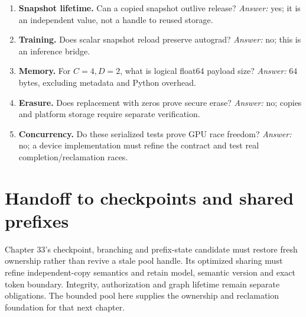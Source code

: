 \begin{enumerate}
\item \textbf{Snapshot lifetime.} Can a copied snapshot outlive release?
\emph{Answer:} yes; it is an independent value, not a handle to reused storage.
\item \textbf{Training.} Does scalar snapshot reload preserve autograd?
\emph{Answer:} no; this is an inference bridge.
\item \textbf{Memory.} For $C=4,D=2$, what is logical float64 payload size?
\emph{Answer:} $64$ bytes, excluding metadata and Python overhead.
\item \textbf{Erasure.} Does replacement with zeros prove secure erase?
\emph{Answer:} no; copies and platform storage require separate verification.
\item \textbf{Concurrency.} Do these serialized tests prove GPU race freedom?
\emph{Answer:} no; a device implementation must refine the contract and test
real completion/reclamation races.
\end{enumerate}

\section{Handoff to checkpoints and shared prefixes}
Chapter 33's checkpoint, branching and prefix-state candidate must restore
fresh ownership rather than revive a stale pool handle. Its optimized sharing
must refine independent-copy semantics and retain model, semantic version and
exact token boundary. Integrity, authorization and graph lifetime remain
separate obligations. The bounded pool here supplies the ownership and
reclamation foundation for that next chapter.
